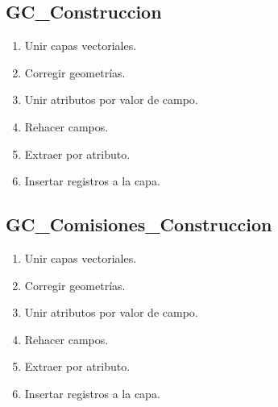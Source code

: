 \documentclass[letterpaper,10pt,spanish]{sphinxmanual}
\begin{document}
\subsection{GC\_Construccion}
\label{\detokenize{ETL_Cobol/Model:gc-construccion}}\begin{enumerate}
%
\item {} 
Unir capas vectoriales.

\item {} 
Corregir geometrías.

\item {} 
Unir atributos por valor de campo.

\item {} 
Rehacer campos.

\item {} 
Extraer por atributo.

\item {} 
Insertar registros a la capa.


\end{enumerate}


\subsection{GC\_Comisiones\_Construccion}
\label{\detokenize{ETL_Cobol/Model:gc-comisiones-construccion}}\begin{enumerate}
%
\item {} 
Unir capas vectoriales.

\item {} 
Corregir geometrías.

\item {} 
Unir atributos por valor de campo.

\item {} 
Rehacer campos.

\item {} 
Extraer por atributo.

\item {} 
Insertar registros a la capa.


\end{enumerate}
\end{document}
